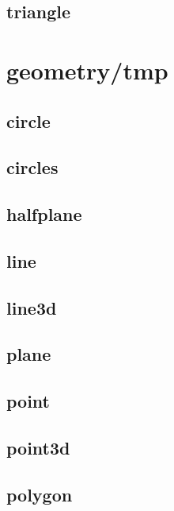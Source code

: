 \documentclass[a4paper,5pt,twocolumn,titlepage]{article}
\begin{document}
\subsection{triangle}


\section{geometry/tmp}
\subsection{circle}

\subsection{circles}

\subsection{halfplane}

\subsection{line}

\subsection{line3d}

\subsection{plane}

\subsection{point}

\subsection{point3d}

\subsection{polygon}

\end{document}
